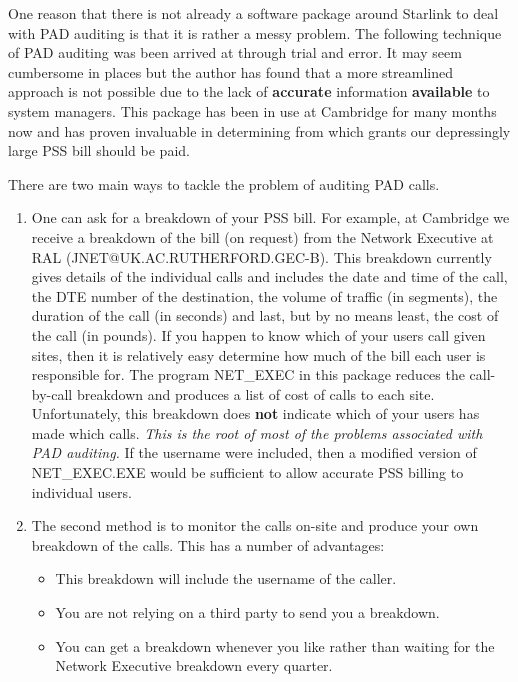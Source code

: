 One reason that there is not already a software package around Starlink to
deal with PAD auditing is that it is rather a messy problem. The following
technique of PAD auditing was been arrived at through trial and error. It
may seem cumbersome in places but the author has found that a more
streamlined approach is not possible due to the lack of {\bf accurate}
 information
{\bf available} to system managers. This package has been in use at Cambridge
for many months now and has proven invaluable in determining from which grants
our depressingly large PSS bill should be paid.

There are two main ways to tackle the problem of auditing PAD calls.

\begin{enumerate}

\item One can ask for a breakdown of your PSS bill. For example, at
Cambridge we receive a breakdown of the bill (on request) from the Network
Executive at RAL (JNET@UK.AC.RUTHERFORD.GEC-B). This breakdown currently
gives details of the individual calls and includes the date and time of the
call, the DTE number of the destination, the volume of traffic (in
segments), the duration of the call (in seconds) and last, but by no means
least, the cost of the call (in pounds). If you happen to know  which of
your users call given sites, then it is relatively easy determine how much
of the bill each user is responsible for. The program NET\_\/EXEC in this
package reduces the call-by-call breakdown and produces a list of cost of
calls to each site. Unfortunately, this breakdown does {\bf not} indicate which of
your users has made which calls. {\it This is the root of most of the problems
associated with PAD auditing.} If the username were included, then a modified
version of NET\_\/EXEC.EXE would be sufficient to allow accurate PSS billing to
individual users.

\item The second method is to monitor the calls on-site and produce your own
breakdown of the calls. This has a number of advantages:

\begin{itemize}

\item This breakdown will include the username of the caller.

\item You are not relying on a third party to send you a breakdown.

\item You can get a breakdown whenever you like rather than
waiting for the Network Executive breakdown every quarter.


\end{itemize}
\end{enumerate}
